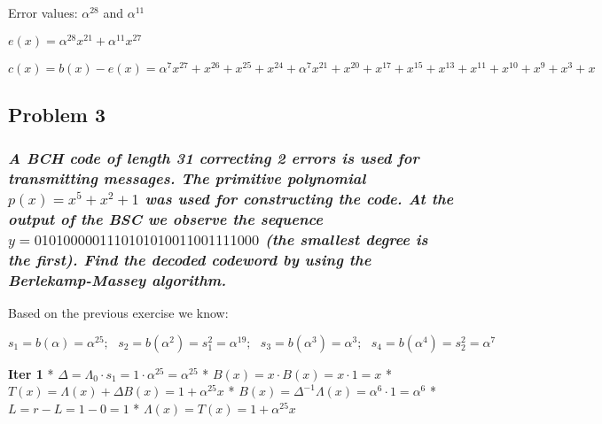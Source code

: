 \documentclass[11pt]{article}
\begin{document}
Error values: \(α^{28}\) and \(α^{11}\)

\(e(x) = α^{28}x^{21} + α^{11}x^{27}\)

\(c(x) = b(x) - e(x) = α^{7}x^{27} + x^{26} + x^{25} + x^{24} + \alpha^{7}x^{21} + x^{20} + x^{17} + x^{15} + x^{13} + x^{11} + x^{10} + x^{9} + x^{3} + x\)

    \hypertarget{problem-3}{%
\subsection{Problem 3}\label{problem-3}}

    \hypertarget{a-bch-code-of-length-31-correcting-2-errors-is-used-for-transmitting-messages.-the-primitive-polynomial-px-x5-x2-1-was-used-for-constructing-the-code.-at-the-output-of-the-bsc-we-observe-the-sequence-y-0101000001110101010011001111000-the-smallest-degree-is-the-first.-find-the-decoded-codeword-by-using-the-berlekamp-massey-algorithm.}{%
\subsubsection{\texorpdfstring{\emph{A BCH code of length 31 correcting
2 errors is used for transmitting messages. The primitive polynomial
\(p(x) = x^5 + x^2 + 1\) was used for constructing the code. At the
output of the BSC we observe the sequence
\(y = 0101000001110101010011001111000\) (the smallest degree is the
first). Find the decoded codeword by using the Berlekamp-Massey
algorithm.}}{A BCH code of length 31 correcting 2 errors is used for transmitting messages. The primitive polynomial p(x) = x\^{}5 + x\^{}2 + 1 was used for constructing the code. At the output of the BSC we observe the sequence y = 0101000001110101010011001111000 (the smallest degree is the first). Find the decoded codeword by using the Berlekamp-Massey algorithm.}}\label{a-bch-code-of-length-31-correcting-2-errors-is-used-for-transmitting-messages.-the-primitive-polynomial-px-x5-x2-1-was-used-for-constructing-the-code.-at-the-output-of-the-bsc-we-observe-the-sequence-y-0101000001110101010011001111000-the-smallest-degree-is-the-first.-find-the-decoded-codeword-by-using-the-berlekamp-massey-algorithm.}}

Based on the previous exercise we know:

\[s_1 = b(α) = α^{25}; \text{ }s_2 = b(α^2) = s_1^2 = α^{19}; \text{ }s_3 = b(α^3) = α^{3}; \text{ }s_4 = b(α^4) = s_2^2 = α^{7}\]

\textbf{Iter 1} * \(Δ = Λ_0⋅s_1 = 1⋅α^{25} = α^{25}\) *
\(B(x) = x⋅B(x) = x⋅1 = x\) * \(T(x) = Λ(x)+ΔB(x) = 1 + α^{25}x\) *
\(B(x) = Δ^{-1}Λ(x) = α^{6}⋅1 = α^{6}\) * \(L = r - L = 1 - 0 = 1\) *
\(Λ(x) = T(x) = 1 + α^{25}x\)
\end{document}
